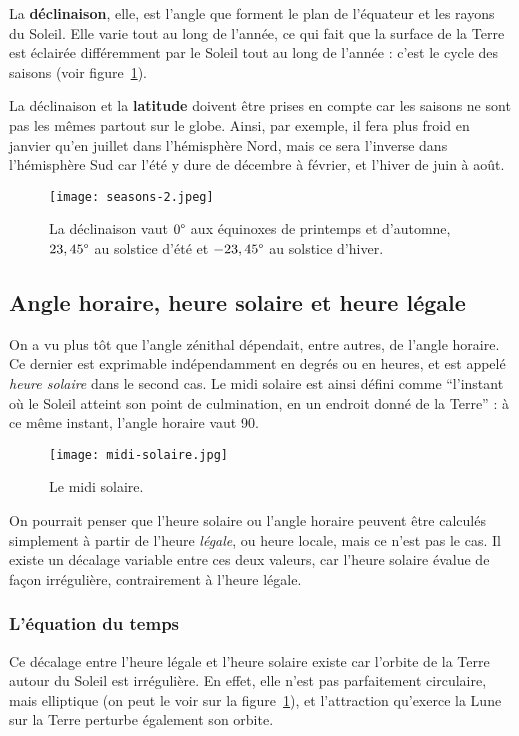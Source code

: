 \documentclass[12pt]{article}
\begin{document}
La \textbf{déclinaison}, elle, est l'angle que forment le plan de l'équateur et les rayons du Soleil.
Elle varie tout au long de l'année,  ce qui fait que la surface de la Terre est éclairée différemment par le Soleil tout au long de l'année : c'est le cycle des saisons (voir figure~\ref{fig:seasons-year}).

La déclinaison et la \textbf{latitude} doivent être prises en compte car les saisons ne sont pas les mêmes partout sur le globe.
Ainsi, par exemple, il fera plus froid en janvier qu'en juillet dans l'hémisphère Nord, mais ce sera l'inverse dans l'hémisphère Sud car l'été y dure de décembre à février, et l'hiver de juin à août.

 \begin{figure}[H]
	\centerline{\texttt{[image: seasons-2.jpeg]}}
	\caption{La déclinaison vaut $0\degree$ aux équinoxes de printemps et d'automne, $23,45\degree$ au solstice d'été et $-23,45\degree$ au solstice d'hiver.}
	\label{fig:seasons-year}
\end{figure}
	

\subsection{Angle horaire, heure solaire et heure légale}

On a vu plus tôt que l'angle zénithal dépendait, entre autres, de l'angle horaire.
Ce dernier est exprimable indépendamment en degrés ou en heures, et est appelé \emph{heure solaire} dans le second cas.
Le midi solaire est ainsi défini comme ``l'instant où le Soleil atteint son point de culmination, en un endroit donné de la Terre'' \cite{temps_solaire_wiki} : à ce même instant, l'angle horaire vaut 90\degree.

 \begin{figure}[H]
	\centerline{\texttt{[image: midi-solaire.jpg]}}
	\caption{Le midi solaire.}
	\label{fig:solar-noon}
\end{figure}

On pourrait penser que l'heure solaire ou l'angle horaire peuvent être calculés simplement à partir de l'heure \emph{légale}, ou heure locale, mais ce n'est pas le cas.
Il existe un décalage variable entre ces deux valeurs, car l'heure solaire évalue de façon irrégulière, contrairement à l'heure légale.



\subsubsection{L'équation du temps}
Ce décalage entre l'heure légale et l'heure solaire existe car l'orbite de la Terre autour du Soleil est irrégulière.
En effet, elle n'est pas parfaitement circulaire, mais elliptique (on peut le voir sur la figure~\ref{fig:seasons-year}), et l'attraction qu'exerce la Lune sur la Terre perturbe également son orbite.
\end{document}
